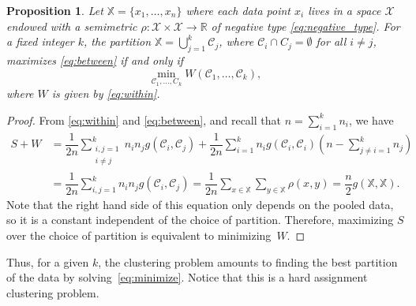 \documentclass[aps,preprint,nofootinbib,floatfix]{revtex4-1}
\newtheorem{proposition}[theorem]{Proposition}
\newcommand\C{{\mathcal{C}}}
\begin{document}
\begin{proposition}
\label{th:minimize}
Let $\mathbb{X} = \{x_1,\dotsc,x_n\}$ where each data point
$x_i$ lives in a space $\mathcal{X}$ endowed with a semimetric $\rho:
\mathcal{X}\times\mathcal{X} \to \mathbb{R}$ of
negative type \eqref{eq:negative_type}. For a fixed integer $k$,
the partition
$\mathbb{X} = \bigcup_{j=1}^k \C_j$, where $\C_i \cap C_j = \emptyset$ for
all $i\ne j$, maximizes \eqref{eq:between} if and only if
\begin{equation}
\label{eq:minimize}
\min_{\C_1,\dotsc,C_k  } W(
\C_1, \dotsc, \C_k),
\end{equation}
where $W$ is given by \eqref{eq:within}.
\end{proposition}
\begin{proof}
From \eqref{eq:within} and \eqref{eq:between}, and recall
that $n=\sum_{i=1}^k n_i$, we have
\begin{equation}
\begin{split}
S + W &= 
\dfrac{1}{2n} \sum_{\substack{i,j=1 \\ i\ne j}}^k n_i n_j g(\C_i, \C_j)
+ \dfrac{1}{2n} \sum_{i=1}^{k} n_i g(\C_i, \C_i) \left( n - 
\sum_{j\ne i = 1}^k n_j \right) \\
& = \dfrac{1}{2n} \sum_{i,j=1}^k n_i n_j g(\C_i, \C_j)
= \dfrac{1}{2n} \sum_{x \in \mathbb{X}} \sum_{y \in \mathbb{X}} \rho(x,y)
= \dfrac{n}{2} g(\mathbb{X}, \mathbb{X}).
\end{split}
\end{equation}
Note that the right hand side of this equation 
only depends on the pooled data, so it is a constant
independent of the choice of partition. Therefore, maximizing
$S$ over the choice of partition is equivalent to minimizing~$W$.
\end{proof}

Thus, for a given $k$, the clustering problem amounts to
finding the best partition of the data by solving~\eqref{eq:minimize}.
Notice that this is a hard assignment clustering problem.
\end{document}
